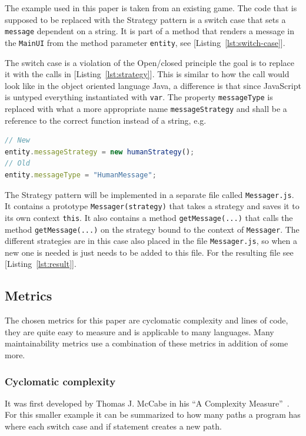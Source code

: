 \documentclass[conference, a4paper]{IEEEtran}
\begin{document}
The example used in this paper is taken from an existing game. The code that is supposed to be replaced with the Strategy pattern is a switch case that sets a \texttt{message} dependent on a string. It is part of a method that renders a message in the \texttt{MainUI} from the method parameter \texttt{entity}, see [Listing~\ref{lst:switch-case}].

The switch case is a violation of the Open/closed principle the goal is to replace it with the calls in [Listing~\ref{lst:strategy}]. This is similar to how the call would look like in the object oriented language Java, a difference is that since JavaScript is untyped everything instantiated with \texttt{var}. The property \texttt{messageType} is replaced with what a more appropriate name \texttt{messageStrategy} and shall be a reference to the correct function instead of a string, e.g.

\begin{lstlisting}[language=JavaScript]
// New
entity.messageStrategy = new humanStrategy();
// Old
entity.messageType = "HumanMessage";
\end{lstlisting}

The Strategy pattern will be implemented in a separate file called \texttt{Messager.js}. It contains a prototype \texttt{Messager(strategy)} that takes a strategy and saves it to its own context \texttt{this}. It also contains a method \texttt{getMessage(...)} that calls the method \texttt{getMessage(...)} on the strategy bound to the context of \texttt{Messager}. The different strategies are in this case also placed in the file \texttt{Messager.js}, so when a new one is needed is just needs to be added to this file. For the resulting file see [Listing~\ref{lst:result}].

\subsection{Metrics}
The chosen metrics for this paper are cyclomatic complexity and lines of code, they are quite easy to measure and is applicable to many languages. Many maintainability metrics use a combination of these metrics in addition of some more.

\subsubsection{Cyclomatic complexity}
It was first developed by Thomas J. McCabe in his ``A Complexity Measure''~\cite{bibitem:CC}. For this smaller example it can be summarized to how many paths a program has where each switch case and if statement creates a new path.
\end{document}
